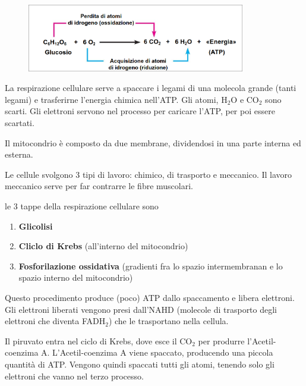 \documentclass[a4paper]{article}
\begin{document}
\begin{figure}[ht!]
    \centering
    \includegraphics[width=0.85\textwidth]{./resp.png}
\end{figure}

La respirazione cellulare serve a spaccare i legami di una molecola grande
(tanti legami) e trasferirne l'energia chimica nell'ATP.
Gli atomi, H\({}_2\)O e CO\({}_2\) sono scarti. Gli elettroni servono nel processo per caricare l'ATP, per poi
essere scartati.


Il mitocondrio è composto da due membrane, dividendosi in una parte interna ed esterna.


Le cellule svolgono 3 tipi di lavoro: chimico, di trasporto e meccanico.
Il lavoro meccanico serve per far contrarre le fibre muscolari.

le 3 tappe della respirazione cellulare sono
\begin{enumerate}
    \item \textbf{Glicolisi}
    \item \textbf{Cliclo di Krebs} (all'interno del mitocondrio)
    \item \textbf{Fosforilazione ossidativa} (gradienti fra lo spazio intermembranan e lo spazio interno del mitocondrio)
\end{enumerate}


Questo procedimento produce (poco) ATP dallo spaccamento e libera elettroni.
Gli elettroni liberati vengono presi dall'NAHD (molecole di trasporto degli elettroni
che diventa FADH\({}_2\))
che le trasportano nella cellula.

Il piruvato entra nel ciclo di Krebs, dove esce il CO\({}_2\) per produrre l'Acetil-coenzima A.
L'Acetil-coenzima A viene spaccato, producendo una piccola quantità di ATP.
Vengono quindi spaccati tutti gli atomi, tenendo solo gli elettroni che vanno nel terzo processo.
\end{document}
